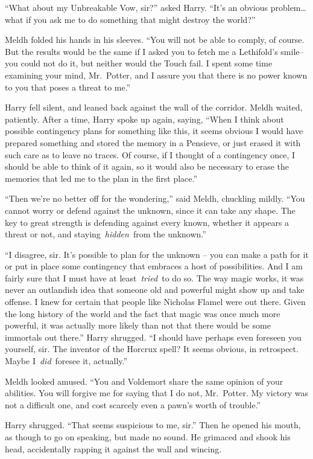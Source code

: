 ``What about my Unbreakable Vow, sir?'' asked Harry. ``It's an obvious
problem\ldots{} what if you ask me to do something that might destroy
the world?''

Meldh folded his hands in his sleeves. ``You will not be able to comply,
of course. But the results would be the same if I asked you to fetch me
a Lethifold's smile-- you could not do it, but neither would the Touch
fail. I spent some time examining your mind, Mr.~Potter, and I assure
you that there is no power known to you that poses a threat to me.''

Harry fell silent, and leaned back against the wall of the corridor.
Meldh waited, patiently. After a time, Harry spoke up again, saying,
``When I think about possible contingency plans for something like this,
it seems obvious I would have prepared something and stored the memory
in a Pensieve, or just erased it with such care as to leave no traces.
Of course, if I thought of a contingency once, I should be able to think
of it again, so it would also be necessary to erase the memories that
led me to the plan in the first place.''

``Then we're no better off for the wondering,'' said Meldh, chuckling
mildly. ``You cannot worry or defend against the unknown, since it can
take any shape. The key to great strength is defending against every
known, whether it appears a threat or not, and
staying~\emph{hidden}~from the unknown.''

``I disagree, sir. It's possible to plan for the unknown -- you can make
a path for it or put in place some contingency that embraces a host of
possibilities. And I am fairly sure that I must have at
least~\emph{tried}~to do so. The way magic works, it was never an
outlandish idea that someone old and powerful might show up and take
offense. I knew for certain that people like Nicholas Flamel were out
there. Given the long history of the world and the fact that magic was
once much more powerful, it was actually more likely than not that there
would be some immortals out there.'' Harry shrugged. ``I should have
perhaps even foreseen you yourself, sir. The inventor of the Horcrux
spell? It seems obvious, in retrospect. Maybe I~\emph{did}~foresee it,
actually.''

Meldh looked amused. ``You and Voldemort share the same opinion of your
abilities. You will forgive me for saying that I do not, Mr.~Potter. My
victory was not a difficult one, and cost scarcely even a pawn's worth
of trouble.''

Harry shrugged. ``That seems suspicious to me, sir.'' Then he opened his
mouth, as though to go on speaking, but made no sound. He grimaced and
shook his head, accidentally rapping it against the wall and wincing.

